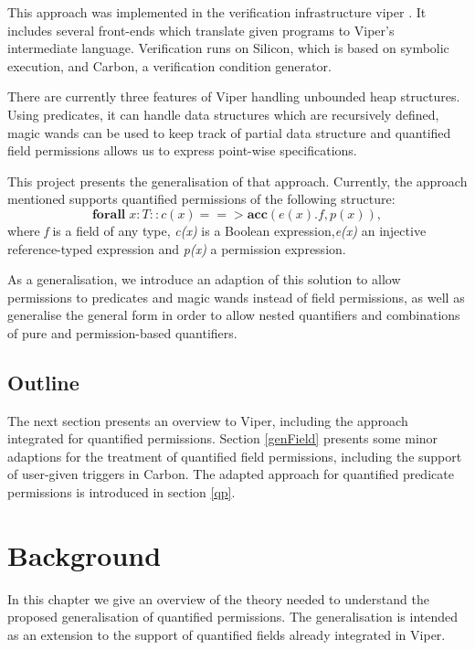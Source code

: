 \documentclass[12pt]{article}
\begin{document}
This approach was implemented in the verification infrastructure viper \cite{viper}. It includes several front-ends which translate given programs to Viper's intermediate language. Verification runs on Silicon, which is based on symbolic execution, and Carbon, a verification condition generator.

There are currently three features of Viper handling unbounded heap structures. Using predicates, it can handle data structures which are recursively defined, magic wands \cite{magicwand} can be used to keep track of partial data structure and quantified field permissions \cite{isc} allows us to express point-wise specifications. 

This project presents the generalisation of that approach. Currently, the approach mentioned supports quantified permissions of the following structure:
\begin{equation}
	\mathbf{forall} \; x:T :: c(x) ==>\mathbf{acc}( e(x).f, p(x) ) ,
\end{equation}
where {\it f} is a field of any type, {\it c(x)} is  a Boolean expression,{\it e(x)} an injective reference-typed expression and {\it p(x)} a permission expression.

As a generalisation, we introduce an adaption of this solution to allow permissions to predicates\cite{predicates} and magic wands\cite{magicwand} instead of field permissions, as well as generalise the general form in order to allow nested quantifiers and combinations of pure and permission-based quantifiers.

\subsection{Outline}

The next section presents an overview to Viper, including the approach integrated for quantified permissions. Section \ref{genField} presents some minor adaptions for the treatment of quantified field permissions, including the support of user-given triggers in Carbon. The adapted approach for quantified predicate permissions is introduced in section \ref{qp}.


\section{Background}
\label{background}
In this chapter we give an overview of the theory needed to understand the proposed generalisation of quantified permissions. The generalisation is intended as an extension to the support of quantified fields already integrated in Viper\cite{viper}\cite{viper2014}.
\end{document}
